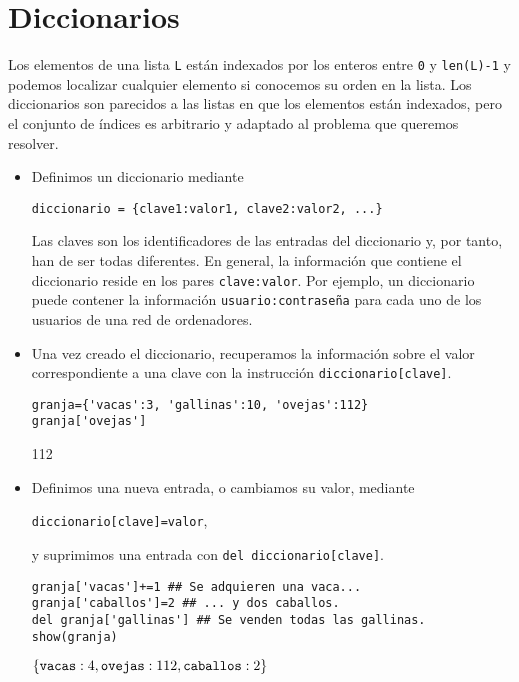 \section{Diccionarios}

Los elementos de una lista \lstinline|L| están indexados por los enteros entre
\lstinline|0| y \lstinline|len(L)-1| y podemos localizar cualquier elemento
si conocemos su orden en la lista. Los diccionarios son parecidos a las listas
en que los elementos están indexados, pero el conjunto de 
índices es arbitrario y adaptado al problema que queremos resolver.
\begin{itemize}
\item  Definimos un diccionario mediante
\begin{lstlisting}
diccionario = {clave1:valor1, clave2:valor2, ...}
\end{lstlisting}
Las claves son los identificadores de las entradas del diccionario y, por tanto,
han de
ser todas diferentes. En general, la información que contiene el diccionario
reside en
los pares  \lstinline|clave:valor|. Por ejemplo, un
diccionario puede contener la información \verb|usuario:contraseña|
   para cada uno de los usuarios de una red de ordenadores.

\item  Una vez creado el diccionario, recuperamos la información sobre el
valor correspondiente a una clave con la instrucción
\lstinline|diccionario[clave]|.
\begin{lstlisting}
granja={'vacas':3, 'gallinas':10, 'ovejas':112}
granja['ovejas']
\end{lstlisting}
\begin{Output}
	112
\end{Output}

\item  Definimos una nueva entrada, o cambiamos su valor, mediante
\begin{center}
\lstinline|diccionario[clave]=valor|,
\end{center}
 \noindent y suprimimos una entrada con
\lstinline|del diccionario[clave]|.
\begin{lstlisting}
granja['vacas']+=1 ## Se adquieren una vaca...
granja['caballos']=2 ## ... y dos caballos.
del granja['gallinas'] ## Se venden todas las gallinas.
show(granja)
\end{lstlisting}
\begin{Output}
	$\left\{\verb|vacas| : 4, \verb|ovejas| : 112, \verb|caballos| :
	2\right\}$
\end{Output}


\end{itemize}
